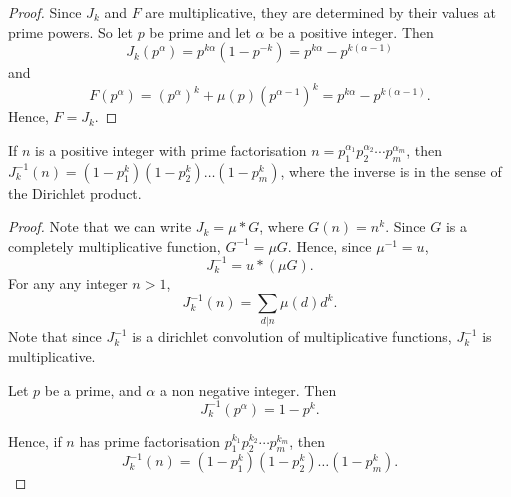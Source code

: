 \documentclass{unswmaths}
\begin{document}
\begin{proof}
    Since $J_k$ and $F$ are multiplicative, they are determined by their values at prime powers. So let $p$ be prime
    and let $\alpha$ be a positive integer. Then
    \begin{equation*}
        J_k(p^\alpha) = p^{k\alpha}(1-p^{-k}) = p^{k\alpha}-p^{k(\alpha-1)}
    \end{equation*}
    and
    \begin{equation*}
        F(p^\alpha) = (p^\alpha)^k+\mu(p)(p^{\alpha-1})^k = p^{k\alpha}-p^{k(\alpha-1)}.
    \end{equation*}
    Hence, $F = J_k$.
\end{proof}
\begin{theorem}
    If $n$ is a positive integer with prime factorisation $n = p_1^{\alpha_1}p_2^{\alpha_2}\cdots p_m^{\alpha_m}$, 
    then $J_k^{-1}(n) = (1-p_1^k)(1-p_2^k)\ldots(1-p_m^k)$, where the inverse is in the sense of the Dirichlet product.
\end{theorem}
\begin{proof}
    Note that we can write $J_k = \mu * G$, where $G(n) = n^k$. Since $G$ is a completely multiplicative
    function, $G^{-1} = \mu G$. Hence, since $\mu^{-1} = u$,
    \begin{equation*}
        J_k^{-1} = u*(\mu G).
    \end{equation*} 
    For any any integer $n>1$, 
    \begin{equation*}
        J_k^{-1}(n) = \sum_{d|n} \mu(d)d^k.
    \end{equation*}
    Note that since $J_k^{-1}$ is a dirichlet convolution of multiplicative functions, $J_k^{-1}$ is multiplicative.
    
    Let $p$ be a prime, and $\alpha$ a non negative integer. Then
    \begin{equation*}
        J_k^{-1}(p^\alpha) = 1-p^k.
    \end{equation*}
    
    Hence, if $n$ has prime factorisation $p_1^{k_1}p_2^{k_2}\cdots p_m^{k_m}$, then
    \begin{equation*}
        J_k^{-1}(n) = (1-p_1^{k})(1-p_2^{k})\ldots(1-p_m^{k}).
    \end{equation*}
\end{proof}
\end{document}
